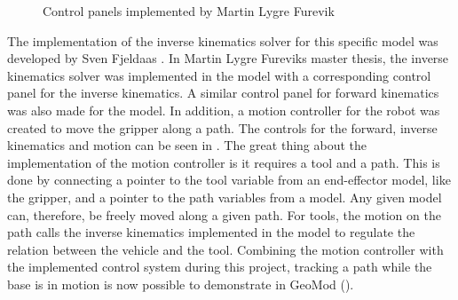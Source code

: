 \begin{figure}[ht]
  \centering
  \hfill
  \hfill
  \caption[Control panels implemented by Martin Lygre Furevik]{Control panels implemented by Martin Lygre Furevik}
  \label{fig:martincontrolpanels}
\end{figure}

The implementation of the inverse kinematics solver for this specific model was developed by Sven Fjeldaas \cite{sven}. In Martin Lygre Fureviks master thesis, the inverse kinematics solver was implemented in the model with a corresponding control panel for the inverse kinematics. A similar control panel for forward kinematics was also made for the model. In addition, a motion controller for the robot was created to move the gripper along a path. The controls for the forward, inverse kinematics and motion can be seen in .  The great thing about the implementation of the motion controller is it requires a tool and a path. This is done by connecting a pointer to the tool variable from an end-effector model, like the gripper, and a pointer to the path variables from a model. Any given model can, therefore, be freely moved along a given path. For tools, the motion on the path calls the inverse kinematics implemented in the model to regulate the relation between the vehicle and the tool. Combining the motion controller with the implemented control system during this project, tracking a path while the base is in motion is now possible to demonstrate in GeoMod (). 


